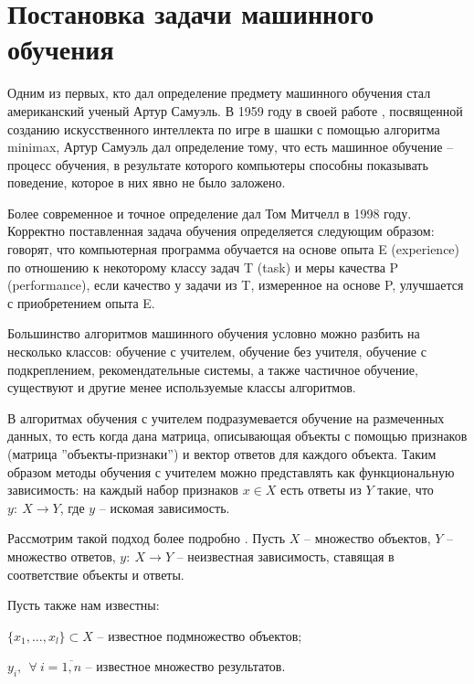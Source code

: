 \section{Постановка задачи машинного обучения}

Одним из первых, кто дал определение предмету машинного обучения стал американский ученый Артур Самуэль. В 1959 году в своей работе \cite{Samuel:ML}, посвященной созданию искусственного интеллекта по игре в шашки с помощью алгоритма minimax, Артур Самуэль дал определение тому, что есть машинное обучение -- процесс обучения, в результате которого компьютеры способны показывать поведение, которое в них явно не было заложено.

Более современное и точное определение дал Том Митчелл в 1998 году. Корректно поставленная задача обучения определяется следующим образом: говорят, что компьютерная программа обучается на основе опыта E (experience) по отношению к некоторому классу задач T (task) и меры качества P (performance), если качество у задачи из T, измеренное на основе P, улучшается с приобретением опыта E.

Большинство алгоритмов машинного обучения условно можно разбить на несколько классов: обучение с учителем, обучение без учителя, обучение с подкреплением, рекомендательные системы, а также частичное обучение, существуют и другие менее используемые классы алгоритмов.

В алгоритмах обучения с учителем подразумевается обучение на размеченных данных, то есть когда дана матрица, описывающая объекты с помощью признаков (матрица ''объекты-признаки'') и вектор ответов для каждого объекта. Таким образом методы обучения с учителем можно представлять как функциональную зависимость: на каждый набор признаков $x \in X$ есть ответы из $Y$ такие, что $y:~X \rightarrow Y$, где $y$ -- искомая зависимость.

Рассмотрим такой подход более подробно \cite{coursera:voroncov}. Пусть $X$ -- множество объектов, $Y$ -- множество ответов, $y:~X \rightarrow Y$ -- неизвестная зависимость, ставящая в соответствие объекты и ответы.

Пусть также нам известны:\\
\begin{description}[font=$\bullet$]
    \item $\{ x_1, \dots, x_l \} \subset X $ -- известное подмножество объектов;
    \item $y_i,~~\forall~i=\overline{1,n}$ -- известное множество результатов.
\end{description}

